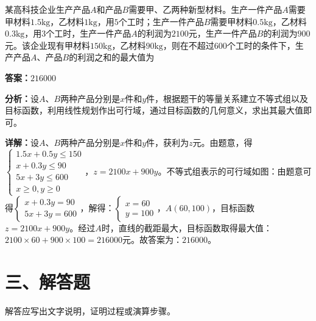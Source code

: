 \begin{question}[points=5]
某高科技企业生产产品$A$和产品$B$需要甲、乙两种新型材料。生产一件产品$A$需要甲材料$1.5\text{kg}$，乙材料$1\text{kg}$，用$5$个工时；生产一件产品$B$需要甲材料$0.5\text{kg}$，乙材料$0.3\text{kg}$，用$3$个工时，生产一件产品$A$的利润为$2100$元，生产一件产品$B$的利润为$900$元。该企业现有甲材料$150\text{kg}$，乙材料$90\text{kg}$，则在不超过$600$个工时的条件下，生产产品$A$、产品$B$的利润之和的最大值为
\fillin[{$216000$}]
\begin{solution}
\textbf{答案：}$216000$

\textbf{分析：}设$A$、$B$两种产品分别是$x$件和$y$件，根据题干的等量关系建立不等式组以及目标函数，利用线性规划作出可行域，通过目标函数的几何意义，求出其最大值即可。

\textbf{详解：}设$A$、$B$两种产品分别是$x$件和$y$件，获利为$z$元。由题意，得$\begin{cases} 1.5x+0.5y\le150 \\ x+0.3y\le90 \\ 5x+3y\le600 \\ x\ge0,y\ge0 \end{cases}$，$z=2100x+900y$。不等式组表示的可行域如图：由题意可得$\begin{cases} x+0.3y=90 \\ 5x+3y=600 \end{cases}$，解得：$\begin{cases} x=60 \\ y=100 \end{cases}$，$A(60,100)$，目标函数$z=2100x+900y$。经过$A$时，直线的截距最大，目标函数取得最大值：$2100\times60+900\times100=216000$元。故答案为：$216000$。
\end{solution}
\end{question}

\section*{三、解答题}
解答应写出文字说明，证明过程或演算步骤。

